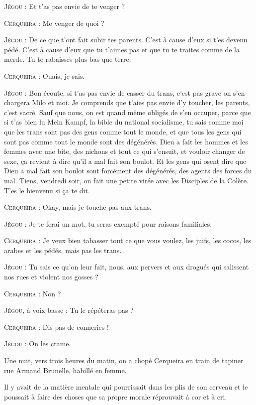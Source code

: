 \begin{dialogue}
\textsc{Jégou} : Et t’as pas envie de te venger ?

\textsc{Cerqueira} : Me venger de quoi ?

\textsc{Jégou} : De ce que t’ont fait subir tes parents. C’est à cause d’eux si t’es devenu pédé. C’est à cause d’eux que tu t’aimes pas et que tu te traites comme de la merde. Tu te rabaisses plus bas que terre.

\textsc{Cerqueira} : Ouais, je sais.

\textsc{Jégou} : Bon écoute, si t’as pas envie de casser du trans, c’est pas grave on s’en chargera Milo et moi. Je comprends que t’aies pas envie d’y toucher, les parents, c’est sacré. Sauf que nous, on est quand même obligés de s’en occuper, parce que si t’as bien lu Mein Kampf, la bible du national socialisme, tu sais comme moi que les trans sont pas des gens comme tout le monde, et que tous les gens qui sont pas comme tout le monde sont des dégénérés. Dieu a fait les hommes et les femmes avec une bite, des nichons et tout ce qui s’ensuit, et vouloir changer de sexe, ça revient à dire qu’il a mal fait son boulot. Et les gens qui osent dire que Dieu a mal fait son boulot sont forcément des dégénérés, des agents des forces du mal. Tiens, vendredi soir, on fait une petite virée avec les Disciples de la Colère. T’es le bienvenu si ça te dit.

\textsc{Cerqueira} : Okay, mais je touche pas aux trans.

\textsc{Jégou} : Je te ferai un mot, tu seras exempté pour raisons familiales.

\textsc{Cerqueira} : Je veux bien tabasser tout ce que vous voulez, les juifs, les cocos, les arabes et les pédés, mais pas les trans.

\textsc{Jégou} : Tu sais ce qu’on leur fait, nous, aux pervers et aux drogués qui salissent nos rues et violent nos gosses ?

\textsc{Cerqueira} : Non ?

\textsc{Jégou}, à voix basse : Tu le répéteras pas ?

\textsc{Cerqueira} : Dis pas de conneries !

\textsc{Jégou} : On les crame.

\end{dialogue}

Une nuit, vers trois heures du matin, on a chopé Cerqueira en train de tapiner rue Armand Brunelle, habillé en femme.

Il y avait de la matière mentale qui pourrissait dans les plis de son cerveau et le poussait à faire des choses que sa propre morale réprouvait à cor et à cri.

